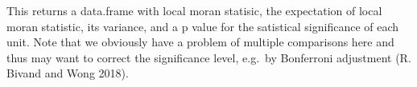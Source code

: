 \documentclass[
  letterpaper,
]{scrbook}
\newenvironment{Shaded}{\begin{snugshade}}{\end{snugshade}}
\newcommand{\FunctionTok}[1]{\textcolor[rgb]{0.28,0.35,0.67}{#1}}
\newcommand{\NormalTok}[1]{\textcolor[rgb]{0.00,0.23,0.31}{#1}}
\newcommand{\OtherTok}[1]{\textcolor[rgb]{0.00,0.23,0.31}{#1}}
\newcommand{\SpecialCharTok}[1]{\textcolor[rgb]{0.37,0.37,0.37}{#1}}
\newcommand{\StringTok}[1]{\textcolor[rgb]{0.13,0.47,0.30}{#1}}
\begin{document}
This returns a data.frame with local moran statisic, the expectation of
local moran statistic, its variance, and a p value for the satistical
significance of each unit. Note that we obviously have a problem of
multiple comparisons here and thus may want to correct the significance
level, e.g.~by Bonferroni adjustment (R. Bivand and Wong 2018).

\begin{Shaded}
\end{Shaded}
\end{document}
